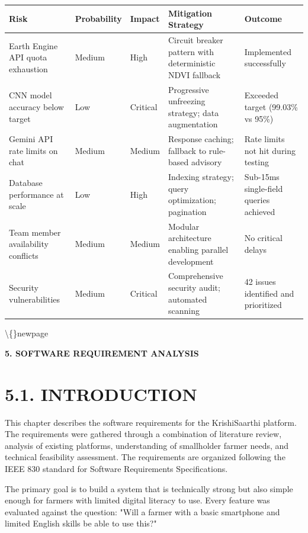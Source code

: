 \documentclass[12pt, a4paper]{report}
\begin{document}
\begin{table}[htbp]
\centering
\small
\begin{tabularx}{\textwidth}{|X|X|X|X|X|}
\hline
Risk & Probability & Impact & Mitigation Strategy & Outcome \\
\hline
Earth Engine API quota exhaustion & Medium & High & Circuit breaker pattern with deterministic NDVI fallback & Implemented successfully \\
CNN model accuracy below target & Low & Critical & Progressive unfreezing strategy; data augmentation & Exceeded target (99.03\% vs 95\%) \\
Gemini API rate limits on chat & Medium & Medium & Response caching; fallback to rule-based advisory & Rate limits not hit during testing \\
Database performance at scale & Low & High & Indexing strategy; query optimization; pagination & Sub-15ms single-field queries achieved \\
Team member availability conflicts & Medium & Medium & Modular architecture enabling parallel development & No critical delays \\
Security vulnerabilities & Medium & Critical & Comprehensive security audit; automated scanning & 42 issues identified and prioritized \\
\hline
\end{tabularx}
\end{table}

\textbackslash\{\}newpage

\begin{center}
{\fontsize{14}{17}\bfseries 5. SOFTWARE REQUIREMENT ANALYSIS}\\
\end{center}
\section{5.1. INTRODUCTION}
This chapter describes the software requirements for the KrishiSaarthi platform. The requirements were gathered through a combination of literature review, analysis of existing platforms, understanding of smallholder farmer needs, and technical feasibility assessment. The requirements are organized following the IEEE 830 standard for Software Requirements Specifications.

The primary goal is to build a system that is technically strong but also simple enough for farmers with limited digital literacy to use. Every feature was evaluated against the question: "Will a farmer with a basic smartphone and limited English skills be able to use this?"
\end{document}
